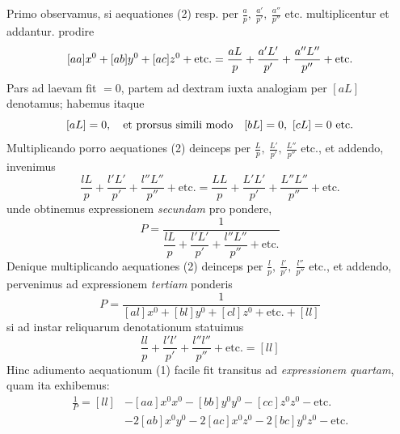 Primo observamus, si aequationes (2) resp. per \(\frac ap,\ \frac{a'}{p'},\ \frac{a''}{p''}\) etc. multiplicentur et addantur. prodire
\[\relax
[aa]x^0+[ab]y^0+[ac]z^0+\text{etc.}=\frac{aL}{p}+\frac{a'L'}{p'}+\frac{a''L''}{p''}+\text{etc.}
\]
Pars ad laevam fit \(=0\), partem ad dextram iuxta analogiam per \([aL]\) denotamus; habemus itaque
\[\relax
[aL]=0,\quad\text{et prorsus simili modo}\quad[bL]=0,\ [cL]=0\ \text{etc.}
\]
Multiplicando porro aequationes (2) deinceps per \(\frac Lp,\ \frac{L'}{p'},\ \frac{L''}{p''}\) etc., et addendo, invenimus
\[
\frac{lL}{p}+\frac{l'L'}{p'}+\frac{l''L''}{p''}+\text{etc.}=\frac{LL}{p}+\frac{L'L'}{p'}+\frac{L''L''}{p''}+\text{etc.}
\]
unde obtinemus expressionem \textit{secundam} pro pondere,
\[
P=\frac{1}{\dfrac{lL}{p}+\dfrac{l'L'}{p'}+\dfrac{l''L''}{p''}+\text{etc.}}
\]
Denique multiplicando aequationes (2) deinceps per \(\frac lp,\ \frac{l'}{p'},\ \frac{l''}{p''}\) etc., et addendo, pervenimus ad expressionem \textit{tertiam} ponderis
\[
P=\frac{1}{[al]x^0+[bl]y^0+[cl]z^0+\text{etc.}+[ll]}
\]
si ad instar reliquarum denotationum statuimus
\[
\frac{ll}{p}+\frac{l'l'}{p'}+\frac{l''l''}{p''}+\text{etc.}=[ll]
\]
Hinc adiumento aequationum (1) facile fit transitus ad \textit{expressionem quartam}, quam ita exhibemus:
\[
\begin{aligned}
\frac1P=[ll]&-[aa]x^0x^0-[bb]y^0y^0-[cc]z^0z^0-\text{etc.}\\
&-2[ab]x^0y^0-2[ac]x^0z^0-2[bc]y^0z^0-\text{etc.}
\end{aligned}
\]
